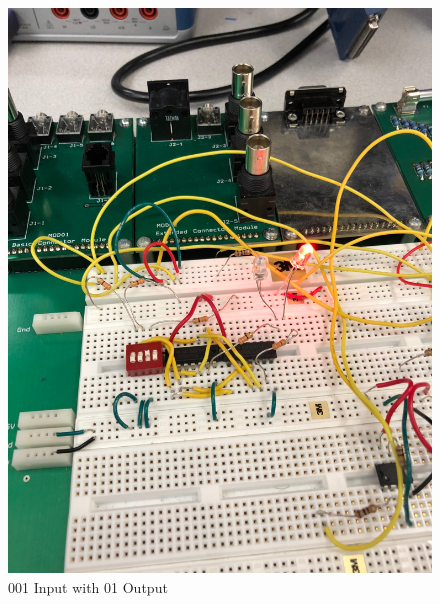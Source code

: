 \documentclass[10pt]{article}
\begin{document}
\begin{centering}
	\begin{figure} [H]
		\centering
		\includegraphics[scale=0.07]{images/001led.jpg}
		\caption{001 Input with 01 Output}
	\end{figure}
\end{centering}
\end{document}
